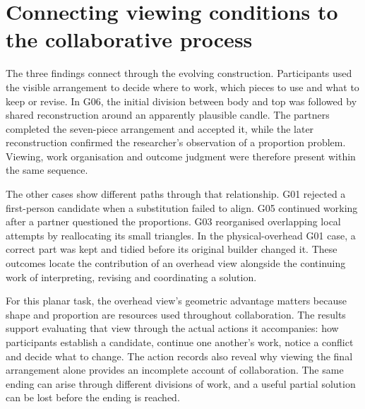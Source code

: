 \section{Connecting viewing conditions to the collaborative process}\label{sec:5-5}

The three findings connect through the evolving construction. Participants used the visible arrangement to decide where to work, which pieces to use and what to keep or revise. In G06, the initial division between body and top was followed by shared reconstruction around an apparently plausible candle. The partners completed the seven-piece arrangement and accepted it, while the later reconstruction confirmed the researcher's observation of a proportion problem. Viewing, work organisation and outcome judgment were therefore present within the same sequence.

The other cases show different paths through that relationship. G01 rejected a first-person candidate when a substitution failed to align. G05 continued working after a partner questioned the proportions. G03 reorganised overlapping local attempts by reallocating its small triangles. In the physical-overhead G01 case, a correct part was kept and tidied before its original builder changed it. These outcomes locate the contribution of an overhead view alongside the continuing work of interpreting, revising and coordinating a solution.

For this planar task, the overhead view's geometric advantage matters because shape and proportion are resources used throughout collaboration. The results support evaluating that view through the actual actions it accompanies: how participants establish a candidate, continue one another's work, notice a conflict and decide what to change. The action records also reveal why viewing the final arrangement alone provides an incomplete account of collaboration. The same ending can arise through different divisions of work, and a useful partial solution can be lost before the ending is reached.

